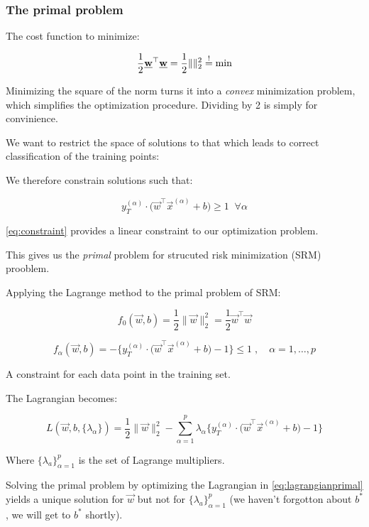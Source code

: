 \begin{frame}\frametitle{The primal problem}


The cost function to minimize:
    
\begin{equation}
\frac{1}{2} \underline{\mathbf{w}}^{\top} \underline{\mathbf{w}} = \frac{1}{2} \lVert \rVert_{2}^{2} \stackrel{\mathrm{!}}{=} \min    
\end{equation}

Minimizing the square of the norm turns it into a \emph{convex} minimization problem, which simplifies the optimization procedure.
Dividing by 2 is simply for convinience.

We want to restrict the space of solutions to that which leads to correct classification of the training points:

We therefore constrain solutions such that:

\begin{equation}
 y_{T}^{(\alpha)} \cdot \big( \vec w^{\top} \vec x^{(\alpha)} + b \big) \ge 1 \;\;\forall \alpha{}
 \label{eq:constraint}  
\end{equation}

\eqref{eq:constraint} provides a linear constraint to our optimization problem.

This gives us the \emph{primal} problem for strucuted risk minimization (SRM) prooblem.
    
\end{frame}

\begin{frame}
Applying the Lagrange method to the primal problem of SRM:

\begin{equation}
f_{0}(\vec w,b) = \frac{1}{2} \lVert \vec w \rVert_{2}^{2} = \frac{1}{2} \vec w^{\top} \vec w
\end{equation}

\begin{equation}
f_{\alpha} (\vec w,b) = -\big\{ y_{T}^{(\alpha)} \cdot \big( \vec w^{\top} \vec x^{(\alpha)} + b \big) -1 \big\} \le 1\;,\quad \alpha = 1,\ldots,p    
\end{equation}

A constraint for each data point in the training set.

The Lagrangian becomes:

\begin{equation}
L(\vec w, b, \{\lambda_{\alpha}\}) = \frac{1}{2} \lVert \vec w \rVert_{2}^{2}
- \sum_{\alpha=1}^{p} \lambda_{\alpha} \big\{ y_{T}^{(\alpha)} \cdot \big( \vec w^{\top} \vec x^{(\alpha)} + b \big) -1 \big\}
\label{ea:lagrangianprimal}
\end{equation}

Where $\{\lambda_{a}\}_{\alpha=1}^{p}$ is the set of Lagrange multipliers.

Solving the primal problem by optimizing the Lagrangian in \eqref{eq:lagrangianprimal} yields a unique solution for $\vec w$ but not for $\{\lambda_{a}\}_{\alpha=1}^{p}$ (we haven't forgotton about $b^{*}$, we will get to $b^{*}$ shortly).

\end{frame}

